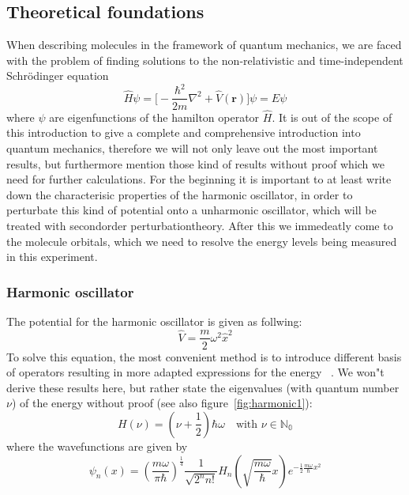 \subsection{Theoretical foundations}
When describing molecules in the framework of quantum mechanics, we are faced with the problem of 
finding solutions to the non-relativistic and time-independent Schrödinger equation
\begin{equation}
    \hat{H} \psi = \Big[- \frac{\hbar^2}{2m} 
        \nabla^2 + \hat{V}(\mathbf{r}) \Big] \psi = E \psi
\end{equation}
where $\psi$ are eigenfunctions of the hamilton operator $\hat{H}$.
It is out of the scope of this introduction to give a complete
and comprehensive introduction into quantum mechanics, therefore
we will not only leave out the most important results, but
furthermore mention those kind of results without proof which
we need for further calculations. For the beginning it is
important to at least write down the characterisic properties
of the harmonic oscillator, in order to perturbate this
kind of potential onto a unharmonic oscillator, which will be
treated with secondorder perturbationtheory. After this we 
immedeatly come to the molecule orbitals, which we need
to resolve the energy levels being measured in this experiment.

\subsubsection{Harmonic oscillator}
The potential for the harmonic oscillator is given as follwing:
\begin{equation}
    \hat{V}= \frac{m}{2} \omega^2 \hat{x}^2
\end{equation}
To solve this equation, the most convenient method is to
introduce different basis of operators resulting in more 
adapted expressions for the energy
~\cite{fliessbach2008quantenmechanik}. We won"t derive 
these results here, but rather state the eigenvalues 
(with quantum number $\nu$)
of the energy without proof
(see also figure~\ref{fig:harmonic1}):
\begin{equation}
    H(\nu) = \left ( \nu + \frac{1}{2} \right )\hbar \omega 
    \quad \text{with $\nu\in \mathbb{N_0}$}
\end{equation}
where the wavefunctions are given by
\begin{equation}
    \psi_n(x)= \left(\frac{m\omega}{\pi\hbar}
    \right)^\frac{1}{4}
    \frac{1}{\sqrt{2^nn!}} H_n
    \left(\sqrt{\frac{m\omega}{\hbar}} x \right)
    e^{-\frac{1}{2}\frac{m\omega}{\hbar}x^2}
\end{equation}

